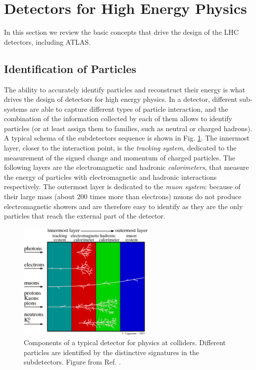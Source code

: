 \section{Detectors for High Energy Physics}
\label{sec:detectors}

In this section we review the basic concepts that drive the design of the LHC detectors, including ATLAS.

\subsection{Identification of Particles}

The ability to accurately identify particles and reconstruct their energy is what drives the design of detectors for high energy physics. In a detector, different sub-systems are able to capture different types of particle interaction, and the combination of the information collected by each of them allows to identify particles (or at least assign them to families, such as neutral or charged hadrons). A typical schema of the subdetectors sequence is shown in Fig. \ref{fig:detector:interaction}. The innermost layer, closer to the interaction point, is the \textit{tracking system}, dedicated to the measurement of the signed change and momentum of charged particles. The following layers are the electromagnetic and hadronic \textit{calorimeters}, that measure the energy of particles with electromagnetic and hadronic interactions respectively. The outermost layer is dedicated to the \textit{muon system}: because of their large mass (about 200 times more than electrons) muons do not produce electromagnetic showers and are therefore easy to identify as they are the only particles that reach the external part of the detector.

\begin{figure}[ht]
\centering
\includegraphics[width=0.6\textwidth]{figures/detector/particles_in_detector}
\caption{Components of a typical detector for physics at colliders. Different particles are identified by the distinctive signatures in the subdetectors. Figure from Ref. \cite{Lippmann:2011bb}.}
\label{fig:detector:interaction}
\end{figure}


